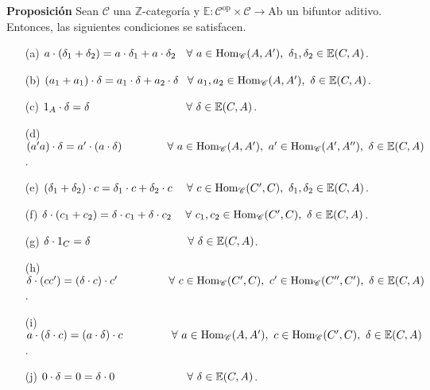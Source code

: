 \documentclass[preview]{standalone}
\begin{document}
\begin{center}
\justifying \textbf{Proposición} Sean $\mathscr{C}$ una $\mathbb{Z}$-categoría y $\mathbb{E}:\mathscr{C}^\text{op}\times\mathscr{C}\to\text{Ab}$ un bifuntor aditivo. Entonces, las siguientes condiciones se satisfacen. \begin{enumerate} \item[(a)] $a\cdot(\delta_1+\delta_2) = a\cdot\delta_1 + a\cdot\delta_2 \hspace{-0.17mm} \quad \forall \ a\in\text{Hom}_\mathscr{C}(A,A'), \ \delta_1,\delta_2\in\mathbb{E}(C,A)$. \item[(b)] $(a_1+a_1)\cdot\delta = a_1\cdot\delta + a_2\cdot\delta \quad \hspace{-0.7mm} \forall \ a_1,a_2\in\text{Hom}_\mathscr{C}(A,A'), \ \delta\in\mathbb{E}(C,A)$. \item[(c)] $1_A\cdot\delta = \delta \hspace{3.07cm} \forall \ \delta\in\mathbb{E}(C,A)$. \item[(d)] $(a'a)\cdot\delta = a'\cdot(a\cdot\delta) \hspace{1.455cm} \forall \ a\in\text{Hom}_\mathscr{C}(A,A'), \ a'\in\text{Hom}_\mathscr{C}(A',A''), \ \delta\in\mathbb{E}(C,A)$. \item[(e)] $(\delta_1+\delta_2)\cdot c = \delta_1\cdot c + \delta_2\cdot c \hspace{4.65mm} \forall \ c\in\text{Hom}_\mathscr{C}(C',C), \ \delta_1,\delta_2\in\mathbb{E}(C,A)$. \item[(f)] $\delta\cdot(c_1+c_2)=\delta\cdot c_1 + \delta\cdot c_2 \hspace{4.425mm} \forall \ c_1,c_2\in\text{Hom}_\mathscr{C}(C',C), \ \delta\in\mathbb{E}(C,A)$. \item[(g)] $\delta\cdot1_C  = \delta \hspace{3.085cm} \forall \ \delta\in\mathbb{E}(C,A)$. \item[(h)] $\delta\cdot(cc') = (\delta\cdot c)\cdot c' \hspace{1.65cm} \forall \ c\in\text{Hom}_\mathscr{C}(C',C), \ c'\in\text{Hom}_\mathscr{C}(C'',C'), \ \delta\in\mathbb{E}(C,A)$. \item[(i)] $a\cdot(\delta\cdot c) = (a\cdot\delta)\cdot c \hspace{1.55cm} \forall \ a\in\text{Hom}_\mathscr{C}(A,A'), \ c\in\text{Hom}_\mathscr{C}(C',C), \ \delta\in\mathbb{E}(C,A)$. \item[(j)] $0\cdot\delta = 0 = \delta\cdot0 \hspace{2.3cm} \forall \ \delta\in\mathbb{E}(C,A)$. \end{enumerate}
\end{center}
\end{document}
